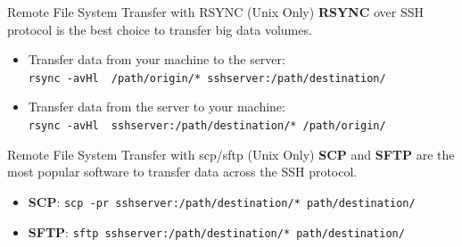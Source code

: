 \documentclass[final,t]{beamer}
\begin{document}
\begin{frame}[fragile]{}
\begin{columns}[t]
\begin{column}{.32\linewidth}
      \begin{block}{Remote File System Transfer with RSYNC (Unix Only)}
       \textbf{RSYNC} over SSH protocol is the best choice to transfer big data volumes.
        \begin{itemize}
        \item Transfer data from your machine to the server:\\ \verb|rsync -avHl  /path/origin/* sshserver:/path/destination/|
        \item Transfer data from the server to your machine:\\ \verb|rsync -avHl  sshserver:/path/destination/* /path/origin/|
        \end{itemize}
      \end{block}

      \begin{block}{Remote File System Transfer with scp/sftp (Unix Only)}
       \textbf{SCP} and \textbf{SFTP} are the most popular software to transfer data across the SSH protocol.
        \begin{itemize}
        \item \textbf{SCP}: \verb|scp -pr sshserver:/path/destination/* path/destination/|
        \item \textbf{SFTP}: \verb|sftp sshserver:/path/destination/* path/destination/|
        \end{itemize}
      \end{block}


\end{column}
\end{columns}
\end{frame}
\end{document}
